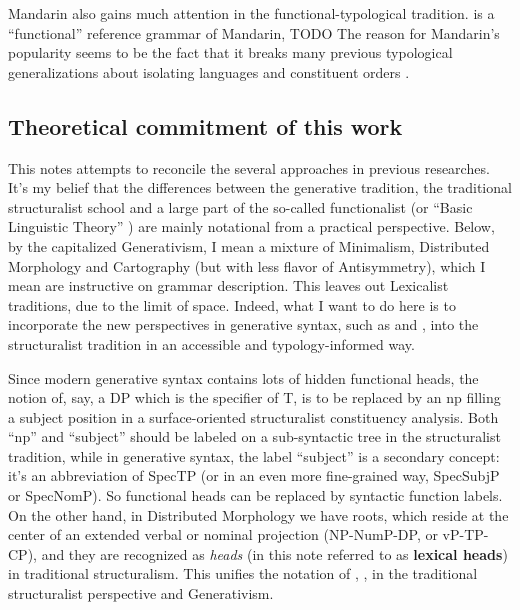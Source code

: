 \documentclass[UTF8, a4paper, oneside, scheme=plain]{ctexrep}
\newcommand*{\citechap}[1]{chap.~{#1}}
\newcommand*{\concept}[1]{\textbf{#1}}
\newcommand*{\term}[1]{\emph{#1}}
\begin{document}
Mandarin also gains much attention in the functional-typological tradition.
\citet{li1989mandarin} is a ``functional'' reference grammar of Mandarin, TODO
The reason for Mandarin's popularity seems to be the fact that 
it breaks many previous typological generalizations about isolating languages and constituent orders
\citep[\citechap{8}]{paul2014new}.

\subsection{Theoretical commitment of this work}\label{sec:theory}

This notes attempts to reconcile the several approaches in previous researches.
It's my belief that the differences between the generative tradition, 
the traditional structuralist school 
and a large part of the so-called functionalist 
(or ``Basic Linguistic Theory'' \citep{dixon2009basic}) 
are mainly notational from a practical perspective.
Below, by the capitalized Generativism,
I mean a mixture of Minimalism, Distributed Morphology and Cartography
(but with less flavor of Antisymmetry),
which I mean are instructive on grammar description.
This leaves out Lexicalist traditions, 
due to the limit of space.
Indeed, what I want to do here 
is to incorporate the new perspectives in generative syntax, 
such as \cite{paul2014new} and \cite{paul2008serial},
into the structuralist tradition
in an accessible and typology-informed way.

Since modern generative syntax contains lots of hidden functional heads,
the notion of, say, a DP which is the specifier of T,
is to be replaced by an \acs{np} filling a subject position 
in a surface-oriented structuralist constituency analysis. 
Both ``\acs{np}'' and ``subject'' should be labeled on a sub-syntactic tree
in the structuralist tradition,
while in generative syntax,
the label ``subject'' is a secondary concept:
it's an abbreviation of SpecTP (or in an even more fine-grained way, SpecSubjP or SpecNomP).
So functional heads can be replaced by syntactic function labels.
On the other hand,
in Distributed Morphology we have roots,
which reside at the center of an extended verbal or nominal projection
(NP-NumP-DP, or vP-TP-CP),
and they are recognized as \term{heads} 
(in this note referred to as \concept{lexical heads})
in traditional structuralism.
This unifies the notation of
\citet{cgel}, \citet{chao1965grammar}, \citet{zhudexigrammar}
in the traditional structuralist perspective
and Generativism.
\end{document}
